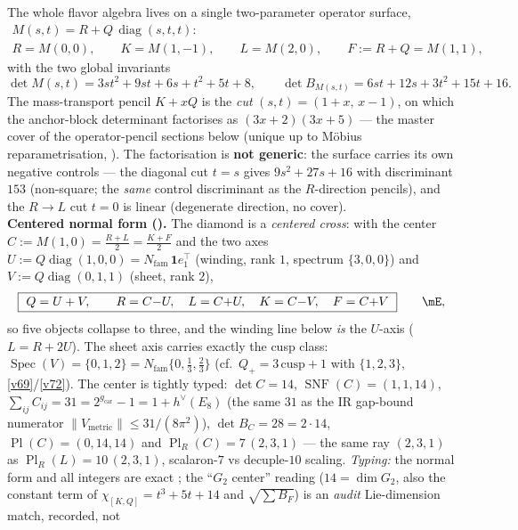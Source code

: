 \documentclass[11pt,a4paper]{article}
\newcommand{\gcar}{g_{\mathrm{car}}}
\newcommand{\Nfam}{N_{\mathrm{fam}}}
\theoremstyle{definition}
\begin{document}
\begin{winbox}
The whole flavor algebra lives on a single two-parameter operator surface,
\[
\begin{gathered}
  M(s,t)=R+Q\,\operatorname{diag}(s,t,t):\\
  R=M(0,0),\qquad K=M(1,-1),\qquad L=M(2,0),\qquad F:=R{+}Q=M(1,1),
\end{gathered}
\]
with the two global invariants
\[
  \det M(s,t)=3st^2+9st+6s+t^2+5t+8,\qquad
  \det B_{M(s,t)}=6st+12s+3t^2+15t+16 .
\]
The mass-transport pencil $K+xQ$ is the \emph{cut} $(s,t)=(1{+}x,\,x{-}1)$, on which the anchor-block
determinant factorises as $(3x{+}2)(3x{+}5)$ --- the master cover of the operator-pencil sections below
(unique up to M\"obius reparametrisation, ). The
factorisation is \textbf{not generic}: the surface carries its own negative controls --- the diagonal cut
$t{=}s$ gives $9s^2{+}27s{+}16$ with discriminant $153$ (non-square; the \emph{same} control discriminant as
the $R$-direction pencils), and the $R{\to}L$ cut $t{=}0$ is linear (degenerate direction, no cover).
\smallskip\\
\noindent\textbf{Centered normal form ().} The diamond is a \emph{centered
cross}: with the center $C:=M(1,0)=\tfrac{R+L}{2}=\tfrac{K+F}{2}$ and the two axes
$U:=Q\operatorname{diag}(1,0,0)=\Nfam\,\mathbf1e_1^\top$ (winding, rank $1$, spectrum $\{3,0,0\}$) and
$V:=Q\operatorname{diag}(0,1,1)$ (sheet, rank $2$),
\[
  \boxed{\ Q=U+V,\qquad R=C{-}U,\quad L=C{+}U,\quad K=C{-}V,\quad F=C{+}V\ }\qquad\mE ,
\]
so five objects collapse to three, and the winding line below \emph{is} the $U$-axis ($L=R+2U$). The sheet
axis carries exactly the cusp class: $\operatorname{Spec}(V)=\{0,1,2\}=\Nfam\{0,\tfrac13,\tfrac23\}$
(cf.\ $Q_+=3\,\mathrm{cusp}+1$ with $\{1,2,3\}$, \vref{v69}/\vref{v72}). The center is tightly typed:
$\det C=14$, $\operatorname{SNF}(C)=(1,1,14)$, $\sum_{ij}C_{ij}=31=2^{\gcar}{-}1=1{+}h^\vee(E_8)$ (the same
$31$ as the IR gap-bound numerator $\|V_{\mathrm{metric}}\|\le31/(8\pi^2)$), $\det B_C=28=2\cdot14$,
$\operatorname{Pl}(C)=(0,14,14)$ and $\operatorname{Pl}_R(C)=7\,(2,3,1)$ --- the same ray $(2,3,1)$ as
$\operatorname{Pl}_R(L)=10\,(2,3,1)$, scalaron-$7$ vs decuple-$10$ scaling. \emph{Typing:} the normal form
and all integers are exact \mE; the ``$G_2$ center'' reading ($14=\dim G_2$, also the constant term of
$\chi_{[K,Q]}=t^3{+}5t{+}14$ and $\sqrt{\sum B_F}$) is an \emph{audit} Lie-dimension match, recorded, not

\end{winbox}
\end{document}
